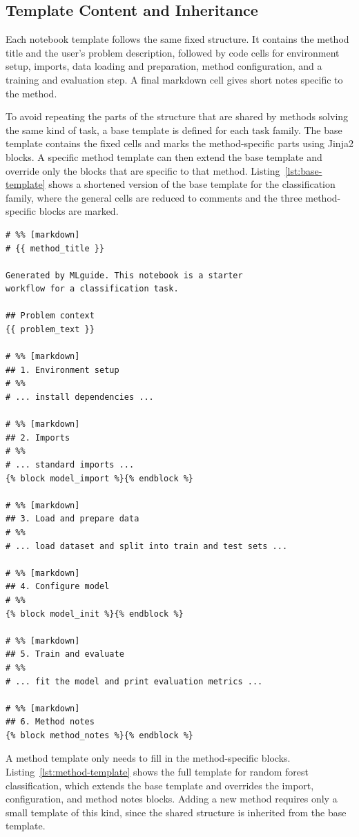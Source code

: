 \subsection{Template Content and Inheritance}
\label{sec:template-content}

Each notebook template follows the same fixed structure.
It contains the method title and the
user's problem description, followed by code cells for
environment setup, imports, data loading and preparation, method
configuration, and a training and evaluation step. A final
markdown cell gives short notes specific to the method.

To avoid repeating the parts of the structure that are 
shared by methods solving the same kind of task, a base 
template is defined for each task family. The base
template contains the fixed cells and marks the
method-specific parts using Jinja2 blocks. A specific method template
can then extend the base template and override only the blocks
that are specific to that method. Listing~\ref{lst:base-template} 
shows a shortened version of the base template for the
classification family, where the general cells are reduced
to comments and the three method-specific blocks are marked.

\begin{lstlisting}[caption={[Base notebook template]Base notebook template for the classification task family.}, label={lst:base-template},
  keepspaces=true]
# %% [markdown]
# {{ method_title }}

Generated by MLguide. This notebook is a starter
workflow for a classification task.

## Problem context
{{ problem_text }}

# %% [markdown]
## 1. Environment setup
# %%
# ... install dependencies ...

# %% [markdown]
## 2. Imports
# %%
# ... standard imports ...
{% block model_import %}{% endblock %}

# %% [markdown]
## 3. Load and prepare data
# %%
# ... load dataset and split into train and test sets ...

# %% [markdown]
## 4. Configure model
# %%
{% block model_init %}{% endblock %}

# %% [markdown]
## 5. Train and evaluate
# %%
# ... fit the model and print evaluation metrics ...

# %% [markdown]
## 6. Method notes
{% block method_notes %}{% endblock %}
\end{lstlisting}

A method template only needs to fill in the method-specific blocks.
Listing~\ref{lst:method-template} shows the full template
for random forest classification, which extends the base
template and overrides the import, configuration, and method
notes blocks. Adding a new method requires only a small
template of this kind, since the shared structure is
inherited from the base template.

